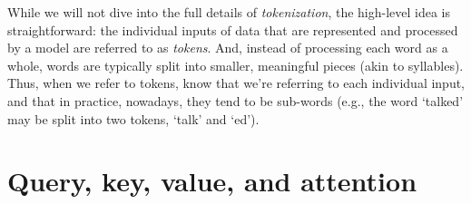 


While we will not dive into the full details of {\em tokenization}, the high-level idea is straightforward: the individual inputs of data that are represented and processed by a model are referred to as {\em tokens}. And, instead of processing each word as a whole, words are typically split into smaller, meaningful pieces (akin to syllables). Thus, when we refer to tokens, know that we're referring to each individual input, and that in practice, nowadays, they tend to be sub-words (e.g., the word `talked' may be split into two tokens, `talk' and `ed').

\section{Query, key, value, and attention}
\label{sec-qkv}

%

